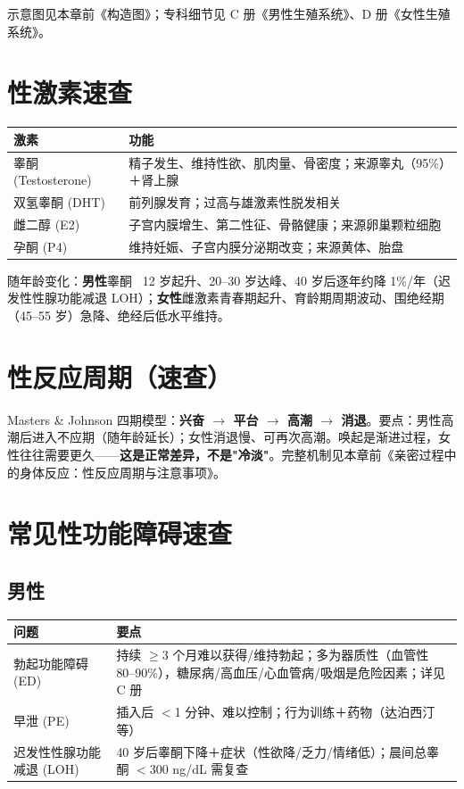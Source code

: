 \documentclass[12pt,UTF8,openany]{ctexbook}
\begin{document}
\noindent 示意图见本章前《构造图》；专科细节见 C 册《男性生殖系统》、D 册《女性生殖系统》。

\section{性激素速查}

\begin{tabularx}{\textwidth}{lX}
\toprule
激素 & 功能 \\
\midrule
睾酮 (Testosterone) & 精子发生、维持性欲、肌肉量、骨密度；来源睾丸（95\%）＋肾上腺 \\
双氢睾酮 (DHT) & 前列腺发育；过高与雄激素性脱发相关 \\
雌二醇 (E2) & 子宫内膜增生、第二性征、骨骼健康；来源卵巢颗粒细胞 \\
孕酮 (P4) & 维持妊娠、子宫内膜分泌期改变；来源黄体、胎盘 \\
\bottomrule
\end{tabularx}

\noindent 随年龄变化：\textbf{男性}睾酮 ~12 岁起升、20--30 岁达峰、40 岁后逐年约降 1\%/年（迟发性性腺功能减退 LOH）；\textbf{女性}雌激素青春期起升、育龄期周期波动、围绝经期（45--55 岁）急降、绝经后低水平维持。

\section{性反应周期（速查）}

Masters \& Johnson 四期模型：\textbf{兴奋 $\to$ 平台 $\to$ 高潮 $\to$ 消退}。要点：男性高潮后进入不应期（随年龄延长）；女性消退慢、可再次高潮。唤起是渐进过程，女性往往需要更久——\textbf{这是正常差异，不是"冷淡"}。完整机制见本章前《亲密过程中的身体反应：性反应周期与注意事项》。

\section{常见性功能障碍速查}

\subsection*{男性}

\begin{tabularx}{\textwidth}{lX}
\toprule
问题 & 要点 \\
\midrule
勃起功能障碍 (ED) & 持续 $\ge$3 个月难以获得/维持勃起；多为器质性（血管性 80--90\%），糖尿病/高血压/心血管病/吸烟是危险因素；详见 C 册 \\
早泄 (PE) & 插入后 $<$1 分钟、难以控制；行为训练＋药物（达泊西汀等） \\
迟发性性腺功能减退 (LOH) & 40 岁后睾酮下降＋症状（性欲降/乏力/情绪低）；晨间总睾酮 $<$300 ng/dL 需复查 \\
\bottomrule
\end{tabularx}
\end{document}
